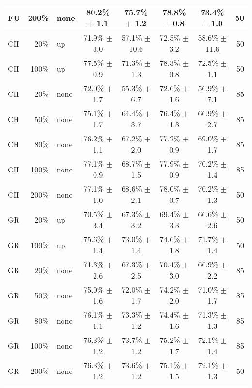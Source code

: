 \begin{table*}[ht]
\begin{tabular}{lrlccccr}
FU  &   200\%  &  none  &   80.2\% $\pm$    1.1  &   75.7\% $\pm$    1.2  &   78.8\% $\pm$    0.8  &   73.4\% $\pm$    1.0  & 50  \\
\hline
CH  &   20\%  &  up  &   71.9\% $\pm$    3.0  &   57.1\% $\pm$   10.6  &   72.5\% $\pm$    3.2  &   58.6\% $\pm$   11.6  & 50  \\
CH  &   100\%  &  up  &   77.5\% $\pm$    0.9  &   71.3\% $\pm$    1.3  &   78.3\% $\pm$    0.8  &   72.5\% $\pm$    1.1  & 50  \\
\hline
CH  &   20\%  &  none  &   72.0\% $\pm$    1.7  &   55.3\% $\pm$    6.7  &   72.6\% $\pm$    1.6  &   56.9\% $\pm$    7.1  & 85  \\
CH  &   50\%  &  none  &   75.1\% $\pm$    1.7  &   64.4\% $\pm$    3.7  &   76.4\% $\pm$    1.3  &   66.9\% $\pm$    2.7  & 85  \\
CH  &   80\%  &  none  &   76.2\% $\pm$    1.1  &   67.2\% $\pm$    2.0  &   77.2\% $\pm$    0.9  &   69.0\% $\pm$    1.7  & 85  \\
CH  &   100\%  &  none  &   77.1\% $\pm$    0.9  &   68.7\% $\pm$    1.5  &   77.9\% $\pm$    0.9  &   70.2\% $\pm$    1.4  & 85  \\
CH  &   200\%  &  none  &   77.1\% $\pm$    1.0  &   68.6\% $\pm$    2.1  &   78.0\% $\pm$    0.7  &   70.2\% $\pm$    1.3  & 50  \\
\hline
GR  &   20\%  &  up  &   70.5\% $\pm$    3.4  &   67.3\% $\pm$    3.2  &   69.4\% $\pm$    3.3  &   66.6\% $\pm$    2.6  & 50  \\
GR  &   100\%  &  up  &   75.6\% $\pm$    1.4  &   73.0\% $\pm$    1.4  &   74.6\% $\pm$    1.8  &   71.7\% $\pm$    1.4  & 50  \\
\hline
GR  &   20\%  &  none  &   71.3\% $\pm$    2.6  &   67.3\% $\pm$    2.5  &   70.4\% $\pm$    3.0  &   66.9\% $\pm$    2.2  & 85  \\
GR  &   50\%  &  none  &   75.0\% $\pm$    1.6  &   72.0\% $\pm$    1.7  &   74.2\% $\pm$    2.0  &   71.0\% $\pm$    1.7  & 85  \\
GR  &   80\%  &  none  &   76.1\% $\pm$    1.1  &   73.3\% $\pm$    1.2  &   74.4\% $\pm$    1.6  &   71.3\% $\pm$    1.3  & 85  \\
GR  &   100\%  &  none  &   76.3\% $\pm$    1.2  &   73.7\% $\pm$    1.2  &   75.2\% $\pm$    1.7  &   72.1\% $\pm$    1.4  & 85  \\
GR  &   200\%  &  none  &   76.3\% $\pm$    1.2  &   73.6\% $\pm$    1.2  &   75.1\% $\pm$    1.5  &   72.1\% $\pm$    1.3  & 50  \\

\end{tabular}
\end{table*}
